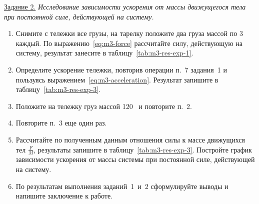 \documentclass[a4paper, 12pt]{extarticle}
\begin{document}
\underline{Задание 2.} \emph{Исследование зависимости ускорения от массы движущегося тела при постоянной силе, действующей на систему.}
\begin{enumerate}
\item Снимите с тележки все грузы, на тарелку положите два груза массой по 3~ каждый. По выражению~\eqref{eq:m3-force} рассчитайте силу, действующую на систему, результат занесите в таблицу~\ref{tab:m3-res-exp-1}. 
\item Определите ускорение тележки, повторив операции п.~7 задания~1 и пользуясь выражением~\eqref{eq:m3-acceleration}. Результат запишите в таблицу~\ref{tab:m3-res-exp-3}. 
\item Положите на тележку груз массой 120~ и повторите п.~2.
\item Повторите п.~3 еще один раз.
\item Рассчитайте по полученным данным отношения силы к массе движущихся тел $\frac{F}{M}$, результаты запишите в таблицу~\ref{tab:m3-res-exp-3}. Постройте график зависимости ускорения от массы системы при постоянной силе, действующей на систему. %
\item По результатам выполнения заданий~1~и~2 сформулируйте выводы и напишите заключение к работе. 
\end{enumerate}
\end{document}
